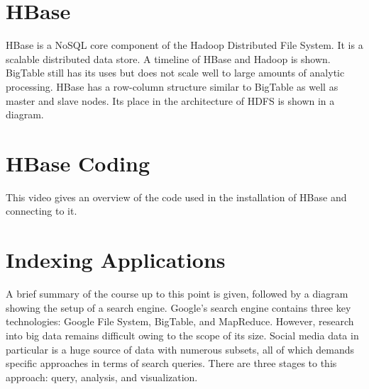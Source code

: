 

\section{HBase}

HBase is a NoSQL core component of the Hadoop Distributed File System.
It is a scalable distributed data store. A timeline of HBase and Hadoop
is shown. BigTable still has its uses but does not scale well to large
amounts of analytic processing. HBase has a row-column structure similar
to BigTable as well as master and slave nodes. Its place in the
architecture of HDFS is shown in a diagram.



\section{HBase Coding}

This video gives an overview of the code used in the installation of
HBase and connecting to it.



\section{Indexing Applications}

A brief summary of the course up to this point is given, followed by a
diagram showing the setup of a search engine. Google's search engine
contains three key technologies: Google File System, BigTable, and
MapReduce. However, research into big data remains difficult owing to
the scope of its size. Social media data in particular is a huge source
of data with numerous subsets, all of which demands specific approaches
in terms of search queries. There are three stages to this approach:
query, analysis, and visualization.



